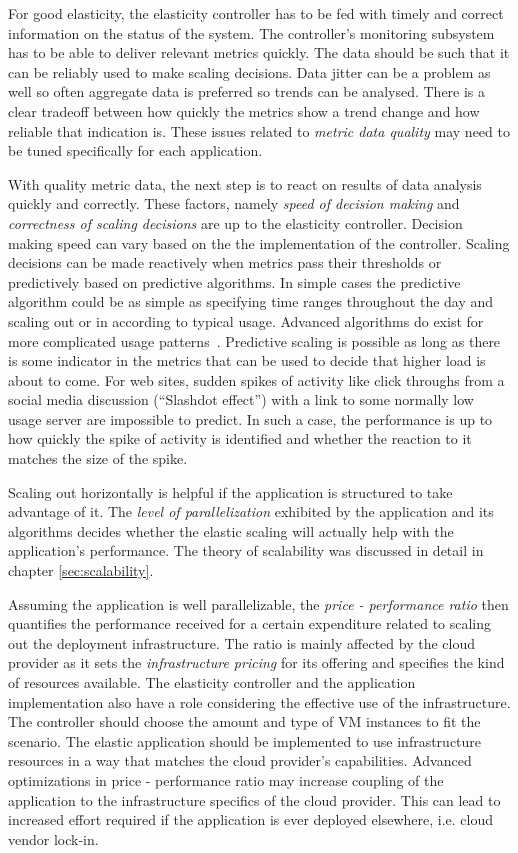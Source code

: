 \documentclass[english]{tktltiki2}
\theoremstyle{definition}
\theoremstyle{remark}
\begin{document}
For good elasticity, the elasticity controller has to be fed with timely and
correct information on the status of the system. The controller's monitoring
subsystem has to be able to deliver relevant metrics quickly. The data should be
such that it can be reliably used to make scaling decisions. Data jitter can be
a problem as well so often aggregate data is preferred so trends can be
analysed. There is a clear tradeoff between how quickly the metrics show a trend
change and how reliable that indication is. These issues related to
\textit{metric data quality} may need to be tuned specifically for each
application.

With quality metric data, the next step is to react on results of data analysis
quickly and correctly. These factors, namely \textit{speed of decision making}
and \textit{correctness of scaling decisions} are up to the elasticity
controller. Decision making speed can vary based on the the implementation of
the controller. Scaling decisions can be made reactively when metrics pass their
thresholds or predictively based on predictive algorithms. In simple cases the
predictive algorithm could be as simple as specifying time ranges throughout the
day and scaling out or in according to typical usage. Advanced algorithms do
exist for more complicated usage patterns~\cite{Iqbal2011}\cite{Tan2012}\cite{
Roy2011}\cite{Chen2011}\cite{Wilkes2010}\cite{Cunha2011}.
Predictive scaling is possible as long as there is some indicator in the metrics
that can be used to decide that higher load is about to come. For web sites,
sudden spikes of activity like click throughs from a social media discussion
(``Slashdot effect'') with a link to some normally low usage server are
impossible to predict. In such a case, the performance is up to how quickly the
spike of activity is identified and whether the reaction to it matches the size
of the spike.

Scaling out horizontally is helpful if the application is structured to take
advantage of it. The \textit{level of parallelization} exhibited by the
application and its algorithms decides whether the elastic scaling will actually
help with the application's performance. The theory of scalability was discussed
in detail in chapter \ref{sec:scalability}.

Assuming the application is well parallelizable, the \textit{price - performance
ratio} then quantifies the performance received for a certain expenditure
related to scaling out the deployment infrastructure. The ratio is mainly
affected by the cloud provider as it sets the \textit{infrastructure pricing}
for its offering and specifies the kind of resources available. The elasticity
controller and the application implementation also have a role considering the
effective use of the infrastructure. The controller should choose the amount and
type of VM instances to fit the scenario. The elastic application should be
implemented to use infrastructure resources in a way that matches the cloud
provider's capabilities. Advanced optimizations in price - performance ratio may
increase coupling of the application to the infrastructure specifics of the
cloud provider. This can lead to increased effort required if the application is
ever deployed elsewhere, i.e. cloud vendor lock-in.
\end{document}
